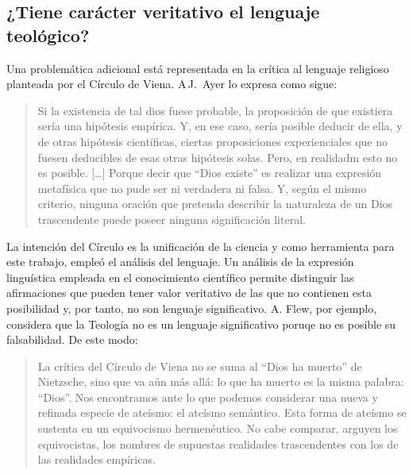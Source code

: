 \subsection{¿Tiene carácter veritativo el lenguaje teológico?}
Una problemática adicional está representada en la crítica al lenguaje religioso
planteada por el Círculo de Viena. A\,J.~Ayer lo expresa como sigue:
\blockquote[{\cite[155]{dominguez2009at}}]{Si la existencia de tal dios fuese
  probable, la proposición de que existiera sería una hipótesis empírica. Y, en
  ese caso, sería posible deducir de ella, y de otras hipótesis científicas,
  ciertas proposiciones experienciales que no fuesen deducibles de esas otras
  hipótesis solas. Pero, en realidadm esto no es posible. [\ldots] Porque decir
  que ``Dios existe'' es realizar una expresión metafísica que no pude ser ni
  verdadera ni falsa. Y, según el mismo criterio, ninguna oración que pretenda
  describir la naturaleza de un Dios trascendente puede poseer ninguna
  significación literal.}

La intención del Círculo es la unificación de la ciencia y como herramienta para
este trabajo, empleó el análisis del lenguaje. Un análisis de la expresión
linguística empleada en el conocimiento científico permite distinguir las
afirmaciones que pueden tener valor veritativo de las que no contienen esta
posibilidad y, por tanto, no son lenguaje significativo. A. Flew, por ejemplo,
considera que la Teología no es un lenguaje significativo poruqe no es posible
su falsabilidad. De este modo:
\blockquote[{\cite[155]{dominguez2009at}}]{La crítica del Círculo de Viena no se
  suma al ``Dios ha muerto'' de Nietzsche, sino que va aún más allá: lo que ha
  muerto es la misma palabra: ``Dios''. Nos encontramos ante lo que podemos
  considerar una nueva y refinada especie de ateísmo: el ateísmo semántico. Esta
  forma de ateísmo se sustenta en un equivocismo hermenéutico. No cabe comparar,
  arguyen los equivocistas, los nombres de supuestas realidades trascendentes
  con los de las realidades empíricas.}
